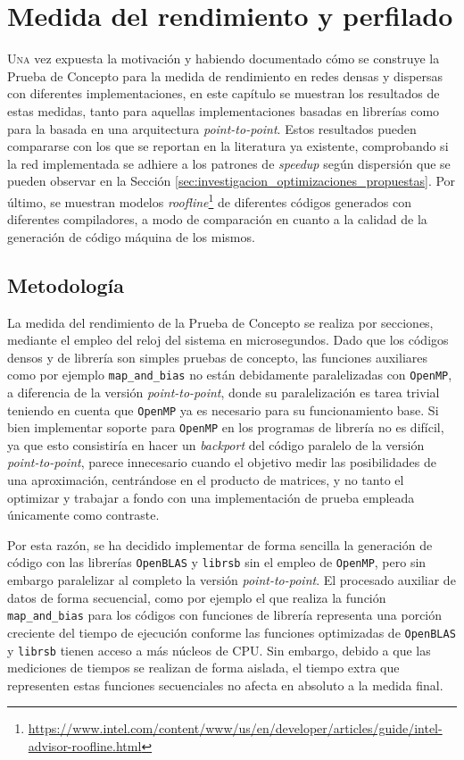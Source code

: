 \chapter{Medida del rendimiento y perfilado}
\label{chap:medida_rendimiento_perfilado}

\lettrine{U}{na} vez expuesta la motivación y habiendo documentado cómo se construye la Prueba de Concepto para la medida de rendimiento en redes densas y dispersas con diferentes implementaciones, en este capítulo se muestran los resultados de estas medidas, tanto para aquellas implementaciones basadas en librerías como para la basada en una arquitectura \textit{point-to-point}. Estos resultados pueden compararse con los que se reportan en la literatura ya existente, comprobando si la red implementada se adhiere a los patrones de \textit{speedup} según dispersión que se pueden observar en la Sección \ref{sec:investigacion_optimizaciones_propuestas}. Por último, se muestran modelos \textit{roofline}\footnote{\url{https://www.intel.com/content/www/us/en/developer/articles/guide/intel-advisor-roofline.html}} de diferentes códigos generados con diferentes compiladores, a modo de comparación en cuanto a la calidad de la generación de código máquina de los mismos.

\section{Metodología}
\label{sec:metodologia}
La medida del rendimiento de la Prueba de Concepto se realiza por secciones, mediante el empleo del reloj del sistema en microsegundos. Dado que los códigos densos y de librería son simples pruebas de concepto, las funciones auxiliares como por ejemplo \texttt{map\_and\_bias} no están debidamente paralelizadas con \texttt{OpenMP}, a diferencia de la versión \textit{point-to-point}, donde su paralelización es tarea trivial teniendo en cuenta que \texttt{OpenMP} ya es necesario para su funcionamiento base. Si bien implementar soporte para \texttt{OpenMP} en los programas de librería no es difícil, ya que esto consistiría en hacer un \textit{backport} del código paralelo de la versión \textit{point-to-point}, parece innecesario cuando el objetivo medir las posibilidades de una aproximación, centrándose en el producto de matrices, y no tanto el optimizar y trabajar a fondo con una implementación de prueba empleada únicamente como contraste.

Por esta razón, se ha decidido implementar de forma sencilla la generación de código con las librerías \texttt{OpenBLAS} y \texttt{librsb} sin el empleo de \texttt{OpenMP}, pero sin embargo paralelizar al completo la versión \textit{point-to-point}. El procesado auxiliar de datos de forma secuencial, como por ejemplo el que realiza la función \texttt{map\_and\_bias} para los códigos con funciones de librería representa una porción creciente del tiempo de ejecución conforme las funciones optimizadas de \texttt{OpenBLAS} y \texttt{librsb} tienen acceso a más núcleos de CPU. Sin embargo, debido a que las mediciones de tiempos se realizan de forma aislada, el tiempo extra que representen estas funciones secuenciales no afecta en absoluto a la medida final.

